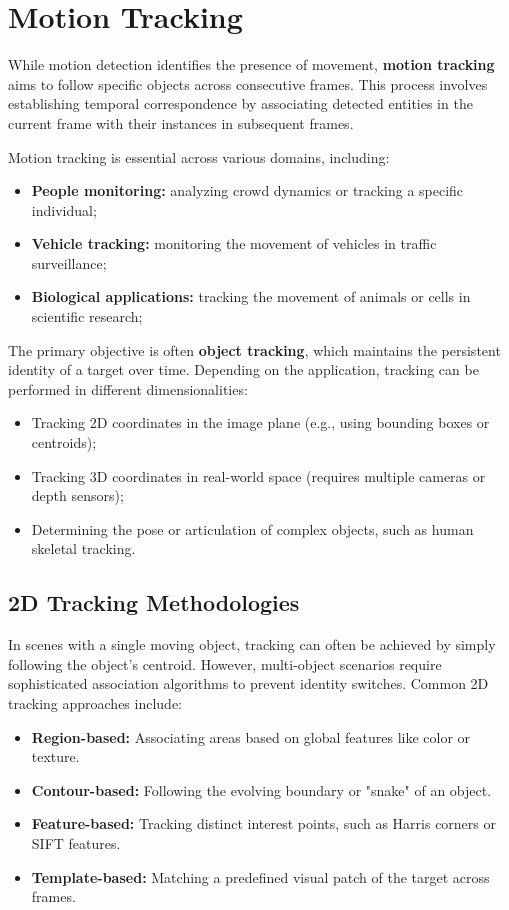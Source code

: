 \section{Motion Tracking}
While motion detection identifies the presence of movement, \textbf{motion tracking} aims to 
follow specific objects across consecutive frames. 
This process involves establishing temporal correspondence by associating detected entities in the current 
frame with their instances in subsequent frames.

Motion tracking is essential across various domains, including:
\begin{itemize}
    \item \textbf{People monitoring:} analyzing crowd dynamics or tracking a specific individual;
    \item \textbf{Vehicle tracking:} monitoring the movement of vehicles in traffic surveillance;
    \item \textbf{Biological applications:} tracking the movement of animals or cells in scientific research;
\end{itemize}

The primary objective is often \textbf{object tracking}, which maintains the persistent identity of a target over time. 
Depending on the application, tracking can be performed in different dimensionalities:
\begin{itemize}
\item Tracking 2D coordinates in the image plane (e.g., using bounding boxes or centroids);
\item Tracking 3D coordinates in real-world space (requires multiple cameras or depth sensors);
\item Determining the pose or articulation of complex objects, such as human skeletal tracking.
\end{itemize}

\subsection{2D Tracking Methodologies}
In scenes with a single moving object, tracking can often be achieved by simply following the object's centroid. 
However, multi-object scenarios require sophisticated association algorithms to prevent identity switches. 
Common 2D tracking approaches include:
\begin{itemize}
    \item \textbf{Region-based:} Associating areas based on global features like color or texture.
    \item \textbf{Contour-based:} Following the evolving boundary or "snake" of an object.
    \item \textbf{Feature-based:} Tracking distinct interest points, such as Harris corners or SIFT features.
    \item \textbf{Template-based:} Matching a predefined visual patch of the target across frames.
\end{itemize}

